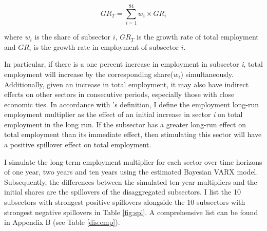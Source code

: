 \documentclass{monashthesis}
\begin{document}
\[
GR_T=\sum_{i=1}^{84} w_i\times {GR}_i
\]

where \(w_i\) is the share of subsector \(i\), \(GR_T\) is the growth rate of total employment and \(GR_i\) is the growth rate in employment of subsector \(i\).

In particular, if there is a one percent increase in employment in subsector \emph{i}, total employment will increase by the corresponding share(\(w_i\)) simultaneously. Additionally, given an increase in total employment, it may also have indirect effects on other sectors in consecutive periods, especially those with close economic ties. In accordance with \textcite{anderson2020}'s definition, I define the employment long-run employment multiplier as the effect of an initial increase in sector \emph{i} on total employment in the long run. If the subsector has a greater long-run effect on total employment than its immediate effect, then stimulating this sector will have a positive spillover effect on total employment.

I simulate the long-term employment multiplier for each sector over time horizons of one year, two years and ten years using the estimated Bayesian VARX model. Subsequently, the differences between the simulated ten-year multipliers and the initial shares are the spillovers of the disaggregated subsectors. I list the 10 subsectors with strongest positive spillovers alongside the 10 subsectors with strongest negative spillovers in Table \ref{fig:spl}. A comprehensive list can be found in Appendix B (see Table \ref{dis:emp}).
\end{document}
